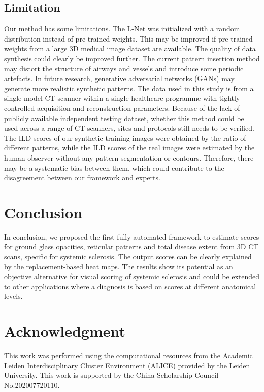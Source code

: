 \subsection{Limitation}
Our method has some limitations. The L-Net was initialized with a random distribution instead of pre-trained weights. This may be improved if pre-trained weights from a large 3D medical image dataset are available. The quality of data synthesis could clearly be improved further. The current pattern insertion method may distort the structure of airways and vessels and introduce some periodic artefacts. In future research, generative adversarial networks (GANs) \cite{Goodfellow2014} may generate more realistic synthetic patterns. The data used in this study is from a single model CT scanner within a single healthcare programme with tightly-controlled acquisition and reconstruction parameters. Because of the lack of publicly available independent testing dataset, whether this method could be used across a range of CT scanners, sites and protocols still needs to be verified. The ILD scores of our synthetic training images were obtained by the ratio of different patterns, while the ILD scores of the real images were estimated by the human observer without any pattern segmentation or contours. Therefore, there may be a systematic bias between them, which could contribute to the disagreement between our framework and experts.

\section{Conclusion}
In conclusion, we proposed the first fully automated framework to estimate scores for ground glass opacities, reticular patterns and total disease extent from 3D CT scans, specific for systemic sclerosis. The output scores can be clearly explained by the replacement-based heat maps. The results show its potential as an objective alternative for visual scoring of systemic sclerosis and could be extended to other applications where a diagnosis is based on scores at different anatomical levels. 

\section{Acknowledgment}
This work was performed using the computational resources from the Academic Leiden Interdisciplinary Cluster Environment (ALICE) provided by the Leiden University. This work is supported by the China Scholarship Council No.202007720110.
